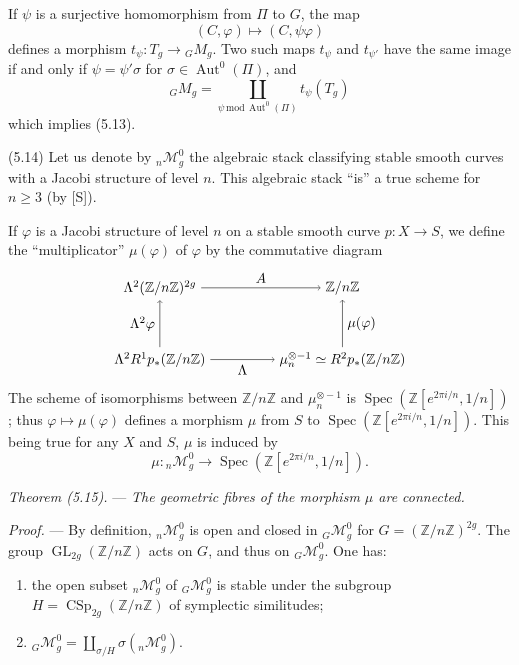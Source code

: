 \documentclass[10pt]{article}
\newcommand{\Spec}{\operatorname{Spec}}
\newcommand{\Aut}{\operatorname{Aut}}
\begin{document}
If $\psi$ is a surjective homomorphism from $\Pi$ to $G$, the map
\[
(C,\varphi)\longmapsto (C,\psi\varphi)
\]
defines a morphism $t_\psi:T_g\to{}_GM_g$. Two such maps $t_\psi$ and $t_{\psi'}$ have the same image if and only if $\psi=\psi'\sigma$ for $\sigma\in\Aut^0(\Pi)$, and
\[
{}_GM_g=\coprod_{\psi\,\mathrm{mod}\,\Aut^0(\Pi)} t_\psi(T_g)
\]
which implies (5.13).

\medskip
\noindent(5.14) Let us denote by ${}_n\mathcal M_g^0$ the algebraic stack classifying stable smooth curves with a Jacobi structure of level $n$. This algebraic stack ``is'' a true scheme for $n\geq3$ (by [S]).

If $\varphi$ is a Jacobi structure of level $n$ on a stable smooth curve $p:X\to S$, we define the ``multiplicator'' $\mu(\varphi)$ of $\varphi$ by the commutative diagram
\[
\begin{tikzpicture}[baseline=(current bounding box.center)]
\node (A) at (0,1.8) {$\Lambda^2(\mathbb Z/n\mathbb Z)^{2g}$};
\node (B) at (4.6,1.8) {$\mathbb Z/n\mathbb Z$};
\node (C) at (0,0) {$\Lambda^2R^1p_*(\mathbb Z/n\mathbb Z)$};
\node (D) at (4.6,0) {$\mu_n^{\otimes -1}\simeq R^2p_*(\mathbb Z/n\mathbb Z)$};
\draw[->] (A) -- node[above] {$A$} (B);
\draw[->] (C) -- node[below] {$\Lambda$} (D);
\draw[->] (C) -- node[left] {$\Lambda^2\varphi$} (A);
\draw[->] (D) -- node[right] {$\mu(\varphi)$} (B);
\end{tikzpicture}
\]
The scheme of isomorphisms between $\mathbb Z/n\mathbb Z$ and $\mu_n^{\otimes -1}$ is $\Spec(\mathbb Z[e^{2\pi i/n},1/n])$; thus $\varphi\mapsto\mu(\varphi)$ defines a morphism $\mu$ from $S$ to $\Spec(\mathbb Z[e^{2\pi i/n},1/n])$. This being true for any $X$ and $S$, $\mu$ is induced by
\[
\mu:{}_n\mathcal M_g^0\longrightarrow \Spec(\mathbb Z[e^{2\pi i/n},1/n]).
\]

\medskip
\noindent\emph{Theorem (5.15).} --- \emph{The geometric fibres of the morphism $\mu$ are connected.}

\noindent\emph{Proof.} --- By definition, ${}_n\mathcal M_g^0$ is open and closed in ${}_G\mathcal M_g^0$ for $G=(\mathbb Z/n\mathbb Z)^{2g}$. The group $\operatorname{GL}_{2g}(\mathbb Z/n\mathbb Z)$ acts on $G$, and thus on ${}_G\mathcal M_g^0$. One has:
\begin{enumerate}[label=(\roman*)]
\item the open subset ${}_n\mathcal M_g^0$ of ${}_G\mathcal M_g^0$ is stable under the subgroup $H=\operatorname{CSp}_{2g}(\mathbb Z/n\mathbb Z)$ of symplectic similitudes;
\item ${}_G\mathcal M_g^0=\coprod_{\sigma/H}\sigma({}_n\mathcal M_g^0)$.
\end{enumerate}
\end{document}
